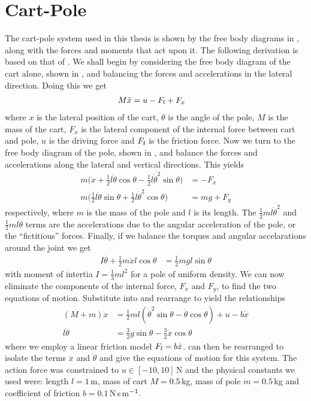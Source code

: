 \section{Cart-Pole} \label{app:cart}
The cart-pole system used in this thesis is shown by the free body diagrams in , along with the forces and moments that act upon it. The following derivation is based on that of \cite{Flo07}. We shall begin by considering the free body diagram of the cart alone, shown in , and balancing the forces and accelerations in the lateral direction. Doing this we get
\begin{align}
M\ddot x &=  u - F_{\text{f}} + F_x
\label{eqn:cart1}
\end{align}
where $x$ is the lateral position of the cart, $\theta$ is the angle of the pole, $M$ is the mass of the cart, $F_x$ is the lateral component of the internal force between cart and pole, $u$ is the driving force and $F_{\text{f}}$ is the friction force. Now we turn to the free body diagram of the pole, shown in , and balance the forces and accelerations along the lateral and vertical directions. This yields
\begin{align}
m\big(\ddot x + \tfrac{1}{2}l\ddot\theta\cos\theta - \tfrac{1}{2}l\dot\theta^2\sin\theta\big) &= -F_x
\label{eqn:cart2} \\
m\big(\tfrac{1}{2}l\ddot\theta\sin\theta + \tfrac{1}{2}l\dot\theta^2\cos\theta\big) &= mg + F_y
\label{eqn:cart3}
\end{align}
respectively, where $m$ is the mass of the pole and $l$ is its length. The $\tfrac{1}{2}ml\dot\theta^2$ and $\tfrac{1}{2}ml\ddot\theta$ terms are the accelerations due to the angular acceleration of the pole, or the ``fictitious'' forces. Finally, if we balance the torques and angular accelarations around the joint we get
\begin{align}
I\ddot\theta + \tfrac{1}{2}m\ddot xl\cos\theta &= \tfrac{1}{2}mgl\sin\theta
\label{eqn:cart4}
\end{align}
with moment of intertia $I = \tfrac{1}{3}ml^2$ for a pole of uniform density.
We can now eliminate the components of the internal force, $F_x$ and $F_y$, to find the two equations of motion. Substitute  into  and rearrange  to yield the relationships
\begin{align}
(M+m)\ddot x &= \tfrac{1}{2}ml(\dot\theta^2\sin\theta - \ddot\theta\cos\theta) + u - b\dot x 
\label{eqn:cart5}\\
l\ddot\theta &= \tfrac{3}{2}g\sin\theta - \tfrac{3}{2}\ddot x\cos\theta
\label{eqn:cart6}
\end{align}
where we employ a linear friction model $F_{\text{f}} = b\dot x$.  can then be rearranged to isolate the terms $\ddot x$ and $\ddot\theta$ and give the equations of motion for this system.
The action force was constrained to $u \in [-10,10]\,$N and the physical constants we used were: length $l = 1\,$m, mass of cart $M = 0.5\,$kg, mass of pole $m = 0.5\,$kg and coefficient of friction $b = 0.1\,$N$\,$s$\,$m$^{-1}$. 


